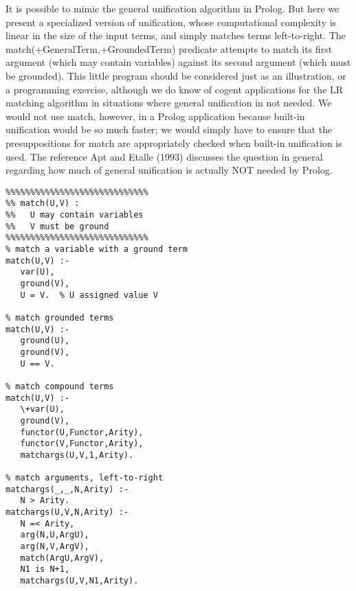 It is possible to mimic the general unification algorithm in Prolog. But here we
present a specialized version of unification, whose computational complexity is
linear in the size of the input terms, and simply matches terms left-to-right.
The match(+GeneralTerm,+GroundedTerm) predicate attempts to match its first
argument (which may contain variables) against its second argument (which must
be grounded). This little program should be considered just as an illustration,
or a programming exercise, although we do know of cogent applications for the LR
matching algorithm in situations where general unification in not needed. We
would not use match, however, in a Prolog application because built-in
unification would be so much faster; we would simply have to ensure that the
presuppositions for match are appropriately checked when built-in unification is
used. The reference Apt and Etalle (1993) discusses the question in general
regarding how much of general unification is actually NOT needed by Prolog.

\begin{verbatim}
%%%%%%%%%%%%%%%%%%%%%%%%%%%%%
%% match(U,V) : 
%%   U may contain variables
%%   V must be ground
%%%%%%%%%%%%%%%%%%%%%%%%%%%%%
% match a variable with a ground term
match(U,V) :- 
   var(U), 
   ground(V),
   U = V.  % U assigned value V

% match grounded terms
match(U,V) :- 
   ground(U), 
   ground(V),
   U == V.

% match compound terms
match(U,V) :- 
   \+var(U), 
   ground(V),
   functor(U,Functor,Arity),
   functor(V,Functor,Arity),
   matchargs(U,V,1,Arity).

% match arguments, left-to-right
matchargs(_,_,N,Arity) :- 
   N > Arity.
matchargs(U,V,N,Arity) :- 
   N =< Arity,
   arg(N,U,ArgU),
   arg(N,V,ArgV), 
   match(ArgU,ArgV), 
   N1 is N+1, 
   matchargs(U,V,N1,Arity).
\end{verbatim}
